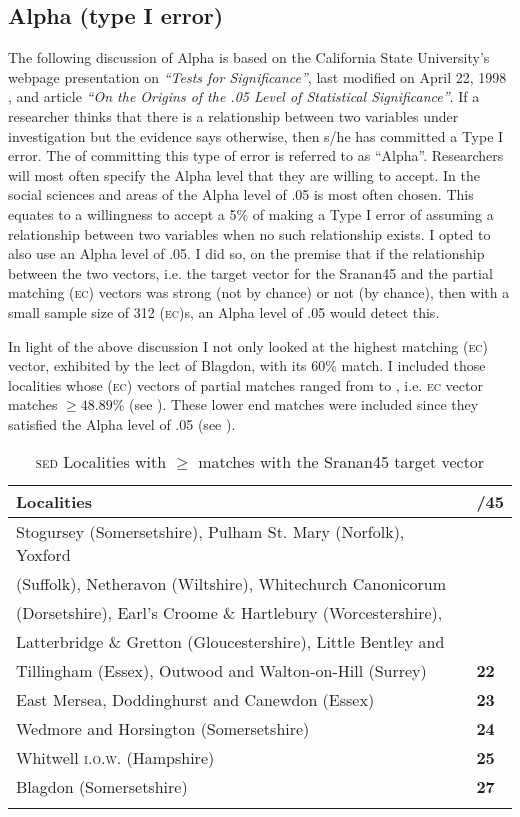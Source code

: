 \subsection{Alpha (type I error)}\label{4.2.1}
The following discussion of Alpha is based on the California State University's webpage presentation on \emph{``Tests for Significance''}, last modified on April 22, 1998 \citep{Stats}, and \citet{Cowles82} article \emph{``On the Origins of the .05 Level of Statistical Significance''}.
If a researcher thinks that there is a relationship between two variables under investigation but the evidence says otherwise, then s/he has committed a Type I error. The  of committing this type of error is referred to as ``Alpha''. Researchers will most often specify the Alpha level that they are willing to accept. In the social sciences and areas of  the Alpha level of .05 is most often chosen. This equates to a willingness to accept a 5\%  of making a Type I error of assuming a relationship between two variables when no such relationship exists. I opted to also use an Alpha level of .05. I did so, on the premise that if the relationship between the two vectors, i.e. the target vector for the Sranan45 and the partial matching (\textsc{ec}) vectors was strong (not by chance) or not (by chance), then with a small sample size of 312 (\textsc{ec})s, an Alpha level of .05 would detect this.

In light of the above discussion I not only looked at the highest matching (\textsc{ec}) vector, exhibited by the lect of Blagdon, with its 60\% match. I included those localities whose (\textsc{ec}) vectors of partial matches ranged from  to , i.e. \textsc{ec} vector matches $\geq 48.89\%$ (see ). These lower end matches were included since they satisfied the Alpha level of .05 (see ).

\begin{table}
\begin{tabular}{ll}
\lsptoprule 
 \textbf{Localities} & \textbf{/45}\\
\midrule 
Stogursey (Somersetshire), Pulham St. Mary (Norfolk), Yoxford \\ (Suffolk), Netheravon (Wiltshire), Whitechurch Canonicorum  \\ (Dorsetshire), Earl's Croome \& Hartlebury (Worcestershire),\\ Latterbridge \& Gretton (Gloucestershire), Little Bentley and \\ Tillingham (Essex), Outwood and Walton-on-Hill (Surrey) & \textbf{22}\\
East Mersea, Doddinghurst and Canewdon (Essex) &  \textbf{23} \\  
Wedmore and Horsington (Somersetshire) & \textbf{24}\\
Whitwell \textsc{i.o.w}. (Hampshire) &  \textbf{25}\\
Blagdon (Somersetshire) &  \textbf{27} \\
\lspbottomrule 
\end{tabular}
\caption{\textsc{sed} Localities with $\geq$  matches with the Sranan45 target vector}
\label{Table 4.3}
\end{table}

